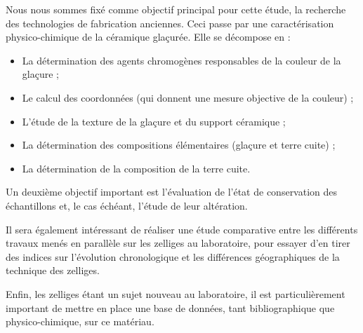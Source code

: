 Nous nous sommes fixé comme objectif principal pour cette étude, la 
recherche des technologies de fabrication anciennes. Ceci passe par 
une caractérisation physico-chimique de la céramique glaçurée. Elle 
se décompose en :

\begin{itemize}
\item La détermination des agents chromogènes responsables de la 
      couleur de la glaçure ;
\item Le calcul des coordonnées \trichros (qui donnent une mesure 
      objective de la couleur) ;
\item L'étude de la texture de la glaçure et du support céramique ;
\item La détermination des compositions élémentaires (glaçure et 
      terre cuite) ;
\item La détermination de la composition \cristallo de la terre cuite.
\end{itemize}

Un deuxième objectif important est l'évaluation de l'état de 
conservation des échantillons et, le cas échéant, l'étude de leur 
altération.

Il sera également intéressant de réaliser une étude comparative 
entre les différents travaux menés en parallèle sur les zelliges au 
laboratoire, pour essayer d'en tirer des indices sur l'évolution 
chronologique et les différences géographiques de la technique des 
zelliges.

Enfin, les zelliges étant un sujet nouveau au laboratoire, il est 
particulièrement important de mettre en place une base de données, 
tant bibliographique que physico-chimique, sur ce matériau.
